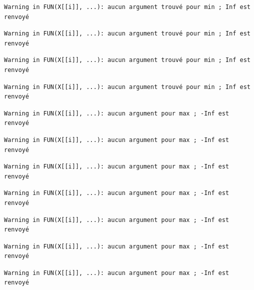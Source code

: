 \documentclass[]{article}
\begin{document}
\begin{verbatim}
Warning in FUN(X[[i]], ...): aucun argument trouvé pour min ; Inf est
renvoyé
\end{verbatim}

\begin{verbatim}
Warning in FUN(X[[i]], ...): aucun argument trouvé pour min ; Inf est
renvoyé
\end{verbatim}

\begin{verbatim}
Warning in FUN(X[[i]], ...): aucun argument trouvé pour min ; Inf est
renvoyé
\end{verbatim}

\begin{verbatim}
Warning in FUN(X[[i]], ...): aucun argument trouvé pour min ; Inf est
renvoyé
\end{verbatim}

\begin{verbatim}
Warning in FUN(X[[i]], ...): aucun argument pour max ; -Inf est renvoyé
\end{verbatim}

\begin{verbatim}
Warning in FUN(X[[i]], ...): aucun argument pour max ; -Inf est renvoyé
\end{verbatim}

\begin{verbatim}
Warning in FUN(X[[i]], ...): aucun argument pour max ; -Inf est renvoyé
\end{verbatim}

\begin{verbatim}
Warning in FUN(X[[i]], ...): aucun argument pour max ; -Inf est renvoyé
\end{verbatim}

\begin{verbatim}
Warning in FUN(X[[i]], ...): aucun argument pour max ; -Inf est renvoyé
\end{verbatim}

\begin{verbatim}
Warning in FUN(X[[i]], ...): aucun argument pour max ; -Inf est renvoyé
\end{verbatim}

\begin{verbatim}
Warning in FUN(X[[i]], ...): aucun argument pour max ; -Inf est renvoyé
\end{verbatim}
\end{document}
